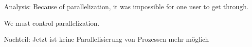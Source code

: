 \begin{frame}[fragile]{}

Analysis: Because of parallelization, it was impossible for one user to get through.
                  
                  We must control parallelization.
                  
\end{frame}

\begin{frame}[fragile]{}

Nachteil: Jetzt ist keine Parallelisierung von Prozessen mehr möglich

\end{frame}


